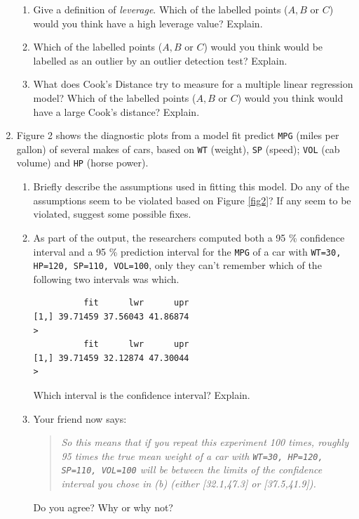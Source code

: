 \documentclass{article}
\begin{document}
\begin{enumerate}
  \begin{enumerate}
  \item Give a definition of {\em leverage}. 
Which of the labelled points ($A, B$ or $C$)
would you think have a high leverage value? Explain.

\qspace 

\item Which of the labelled points ($A, B$ or $C$)
would you think would be labelled as an outlier by an outlier detection test? Explain.

\qspace 

\item What does Cook's Distance try to measure for a multiple linear regression model? Which of the labelled points ($A, B$ or $C$)
would you think would have a large Cook's distance? Explain.
  \end{enumerate}

\qspace 


\newpage 

\item Figure 2 shows the diagnostic plots from a model
fit predict {\tt MPG} (miles per gallon) of several makes of cars, based on {\tt WT} (weight), {\tt SP} (speed); {\tt VOL} (cab volume) and {\tt HP} (horse power).

  \begin{enumerate}
  \item Briefly describe the assumptions used in fitting this model. Do any of the assumptions seem to be violated based on Figure \ref{fig2}?
If any seem to be violated, suggest some possible fixes.

\qspace 


\item As part of the output, the researchers computed both a 95 \% confidence interval and a 95 \% prediction interval for the {\tt MPG} of a car with {\tt WT=30, HP=120, SP=110, VOL=100}, only they can't remember which of the following two intervals was which.

\begin{verbatim}
          fit      lwr      upr
[1,] 39.71459 37.56043 41.86874
>
          fit      lwr      upr
[1,] 39.71459 32.12874 47.30044
> 
\end{verbatim}
Which interval is the confidence interval? Explain.

\qspace 


\item Your friend now says:
  \begin{quote}
    {\em So this means that if you repeat this experiment
100 times, roughly 95 times the true mean weight of a car
with {\tt WT=30, HP=120, SP=110, VOL=100} will be between the limits
of the confidence interval you chose in (b) (either [32.1,47.3] or [37.5,41.9]).}
  \end{quote}
Do you agree? Why or why not?


\end{enumerate}
\end{enumerate}
\end{document}
